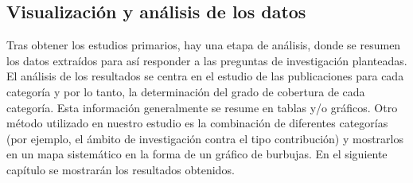 \begin{itemize}
\end{itemize}

\subsection{Visualización y análisis de los datos}
Tras obtener los estudios primarios, hay una etapa de análisis, donde se resumen los datos extraídos para así responder a las preguntas de investigación planteadas. El análisis de los resultados se centra en el estudio de las publicaciones para cada categoría y por lo tanto, la determinación del grado de cobertura de cada categoría. Esta información generalmente se resume en tablas y/o gráficos. Otro método utilizado en nuestro estudio es la combinación de diferentes categorías (por ejemplo, el ámbito de investigación contra el tipo contribución) y mostrarlos en un mapa sistemático en la forma de un gráfico de burbujas.
En el siguiente capítulo se mostrarán los resultados obtenidos.

